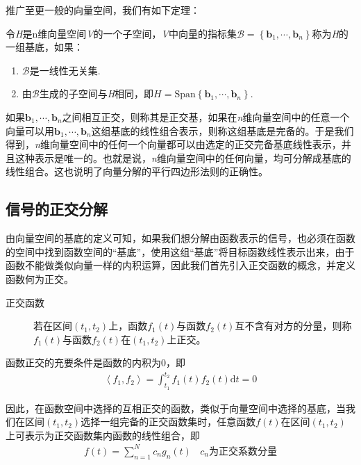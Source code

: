 \documentclass{hitreport}
\begin{document}
推广至更一般的向量空间，我们有如下定理：
\begin{theorem}
令\textit{H}是n维向量空间\textit{V}的一个子空间，\textit{V}中向量的指标集$\mathcal{B} = \left\{\textbf{b}_1,\cdots,\textbf{b}_n\right\}$称为\textit{H}的一组基底，如果：
\begin{enumerate}
\item $\mathcal{B}$是一线性无关集.
\item 由$\mathcal{B}$生成的子空间与\textit{H}相同，即$\textit{H} = \text{Span}\left\{\textbf{b}_1,\cdots,\textbf{b}_n\right\}$.
\end{enumerate}
\end{theorem}

如果$\textbf{b}_1,\cdots,\textbf{b}_n$之间相互正交，则称其是正交基，如果在\textit{n}维向量空间中的任意一个向量可以用$\textbf{b}_1,\cdots,\textbf{b}_n$这组基底的线性组合表示，则称这组基底是完备的。于是我们得到，\textit{n}维向量空间中的任何一个向量都可以由选定的正交完备基底线性表示，并且这种表示是唯一的。也就是说，\textit{n}维向量空间中的任何向量，均可分解成基底的线性组合。这也说明了向量分解的平行四边形法则的正确性。

\subsection{信号的正交分解}

由向量空间的基底的定义可知，如果我们想分解由函数表示的信号，也必须在函数的空间中找到函数空间的“基底”，使用这组“基底”将目标函数线性表示出来，由于函数不能做类似向量一样的内积运算，因此我们首先引入正交函数的概念，并定义函数何为正交。
\begin{description}
\item[正交函数] 

若在区间$\left(t_1,t_2\right)$上，函数$f_1\left(t\right)$与函数$f_2\left(t\right)$互不含有对方的分量，则称$f_1\left(t\right)$与函数$f_2\left(t\right)$在$\left(t_1,t_2\right)$上正交。
\end{description}
\begin{theorem} [函数正交的充要条件]
函数正交的充要条件是函数的内积为0，即
\begin{align}
\left< f_1,f_2\right> = \int_{t_1}^{t_2}{f_1\left(t\right)f_2\left(t\right)\mathrm{d}t} = 0
\end{align}
\end{theorem}

因此，在函数空间中选择的互相正交的函数，类似于向量空间中选择的基底，当我们在区间$\left(t_1,t_2\right)$选择一组完备的正交函数集时，任意函数$f\left(t\right)$在区间$\left(t_1,t_2\right)$上可表示为正交函数集内函数的线性组合，即
\begin{align}
f\left(t\right) = \sum_{n=1}^{N}{c_ng_n\left(t\right)}\ \ \ \ c_n\text{为正交系数分量}
\end{align}
\end{document}
